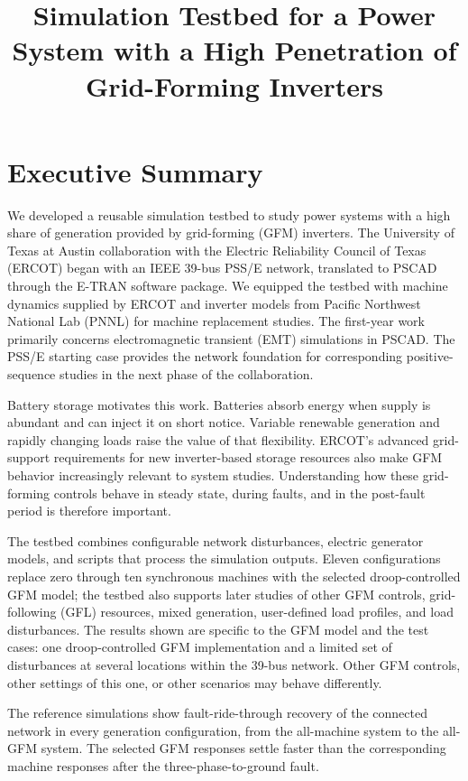 \documentclass[11pt]{article}
\title{Simulation Testbed for a Power System with a High Penetration of Grid-Forming Inverters}
\begin{document}
\hypersetup{pageanchor=false}
\utcover
\hypersetup{pageanchor=true}
\tableofcontents
\clearpage

\section*{Executive Summary}

We developed a reusable simulation testbed to study power systems with a high share of generation provided by grid-forming (GFM) inverters. The University of Texas at Austin collaboration with the Electric Reliability Council of Texas (ERCOT) began with an IEEE 39-bus PSS/E network, translated to PSCAD through the E-TRAN software package. We equipped the testbed with machine dynamics supplied by ERCOT and inverter models from Pacific Northwest National Lab (PNNL) for machine replacement studies. The first-year work primarily concerns electromagnetic transient (EMT) simulations in PSCAD. The PSS/E starting case provides the network foundation for corresponding positive-sequence studies in the next phase of the collaboration.

Battery storage motivates this work. Batteries absorb energy when supply is abundant and can inject it on short notice. Variable renewable generation and rapidly changing loads raise the value of that flexibility. ERCOT's advanced grid-support requirements for new inverter-based storage resources also make GFM behavior increasingly relevant to system studies. Understanding how these grid-forming controls behave in steady state, during faults, and in the post-fault period is therefore important.

The testbed combines configurable network disturbances, electric generator models, and scripts that process the simulation outputs. Eleven configurations replace zero through ten synchronous machines with the selected droop-controlled GFM model; the testbed also supports later studies of other GFM controls, grid-following (GFL) resources, mixed generation, user-defined load profiles, and load disturbances. The results shown are specific to the GFM model and the test cases: one droop-controlled GFM implementation and a limited set of disturbances at several locations within the 39-bus network. Other GFM controls, other settings of this one, or other scenarios may behave differently.

The reference simulations show fault-ride-through recovery of the connected network in every generation configuration, from the all-machine system to the all-GFM system. The selected GFM responses settle faster than the corresponding machine responses after the three-phase-to-ground fault. 
\end{document}
